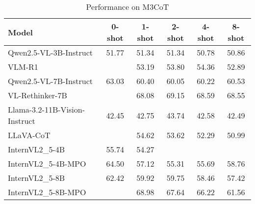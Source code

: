 \begin{table*}[t]\centering
\small
\begin{table}
\caption{Performance on M3CoT}
\label{tab:m3cot_results}
\begin{tabular}{p{4.5cm}ccccc}
\toprule
Model & 0-shot & 1-shot & 2-shot & 4-shot & 8-shot \\
\midrule
Qwen2.5-VL-3B-Instruct & 51.77 & 51.34 & 51.34 & 50.78 & 50.86 \\
VLM-R1 &  & 53.19 & 53.80 & 54.36 & 52.89 \\
Qwen2.5-VL-7B-Instruct & 63.03 & 60.40 & 60.05 & 60.22 & 60.53 \\
VL-Rethinker-7B &  & 68.08 & 69.15 & 68.59 & 68.55 \\
Llama-3.2-11B-Vision-Instruct & 42.45 & 42.75 & 43.74 & 42.58 & 42.49 \\
LLaVA-CoT &  & 54.62 & 53.62 & 52.29 & 50.99 \\
InternVL2_5-4B & 55.74 & 54.27 &  &  &  \\
InternVL2_5-4B-MPO & 64.50 & 57.12 & 55.31 & 55.69 & 58.76 \\
InternVL2_5-8B & 62.42 & 59.92 & 59.75 & 58.46 & 57.42 \\
InternVL2_5-8B-MPO &  & 68.98 & 67.64 & 66.22 & 61.56 \\
\bottomrule
\end{tabular}
\end{table}

\end{table*}